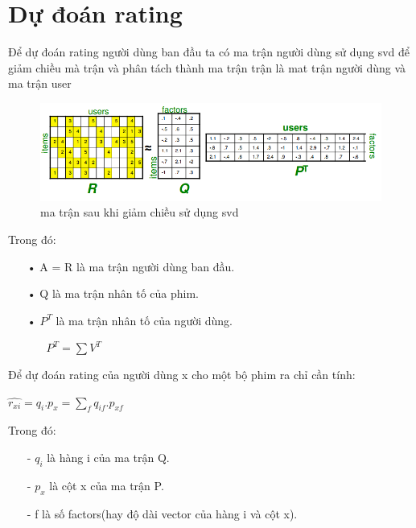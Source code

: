 \documentclass[a4paper,11pt]{report}
\begin{document}
\section{Dự đoán rating}
Để dự đoán rating người dùng ban đầu ta có ma trận người dùng sử dụng svd để giảm chiều mà trận và phân tách thành ma trận trận là mat trận người dùng và ma trận user
\begin{figure}
\begin{center}
\includegraphics[scale=0.8]{svd1.png}
\caption{ma trận sau khi giảm chiều sử dụng svd}
\end{center}
\end{figure}
\newpage
Trong đó:
\begin{itemize}
\item[•] A = R là ma trận người dùng ban đầu.
\item[•] Q là ma trận nhân tố của phim.
\item[•] $P^T$ là ma trận nhân tố của người dùng.
\begin{itemize}
\item[] $P^T = \sum V^T$
\end{itemize}
\end{itemize}
Để dự đoán rating của người dùng x cho một bộ phim ra chỉ cần tính:
\begin{center}
$\hat{r_{xi}} = q_i.p_x = \sum_fq_{if}.p_{xf}$
\end{center}
Trong đó:
\begin{itemize}
\item[-] $q_i$ là hàng i của ma trận Q.
\item[-] $p_x$ là cột x của ma trận P.
\item[-] f là số factors(hay độ dài vector của hàng i và cột x).
\end{itemize}
\end{document}
